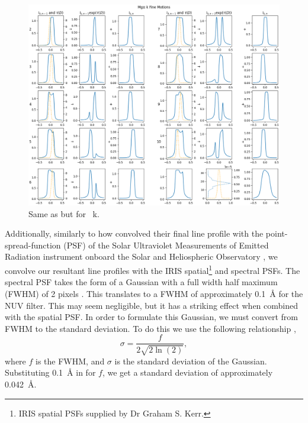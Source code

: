 \begin{figure}[h]
    \includegraphics[width=\linewidth]{./03Modelling2D/figs/StanoPlots/slow/k.png}
    \caption[Slow Moving \mgii~k threads.]{Same as  but for \mgii~k.}
    \label{slowmgiik} 
\end{figure}
Additionally, similarly to  how \cite{gunar_lyman-line_2008} convolved their final line profile with the point-spread-function (PSF) of the Solar Ultraviolet Measurements of Emitted Radiation \citep[SUMER; ][]{wilhelm_sumer_1995} instrument onboard the Solar and Heliospheric Observatory \citep[SOHO; ][]{domingo_soho_1995}, we convolve our resultant line profiles with the IRIS spatial\footnote{IRIS spatial PSFs supplied by Dr Graham S. Kerr.} and spectral PSFs. The spectral PSF takes the form of a Gaussian with a full width half maximum (FWHM) of 2 pixels \citep{depontieu_interface_2014}. This translates to a FWHM of approximately 0.1~\AA{} for the NUV filter. This may seem negligible, but it has a striking effect when combined with the spatial PSF. In order to formulate this Gaussian, we must convert from FWHM to the standard deviation. To do this we use the following relationship \citep{weisstein_gaussian_2022},
\begin{equation}
    \sigma=\frac{f}{2\sqrt{2\ln(2)}},
\end{equation}
where $f$ is the FWHM, and $\sigma$ is the standard deviation of the Gaussian. Substituting 0.1~\AA{} in for $f$, we get a standard deviation of approximately 0.042~\AA.


